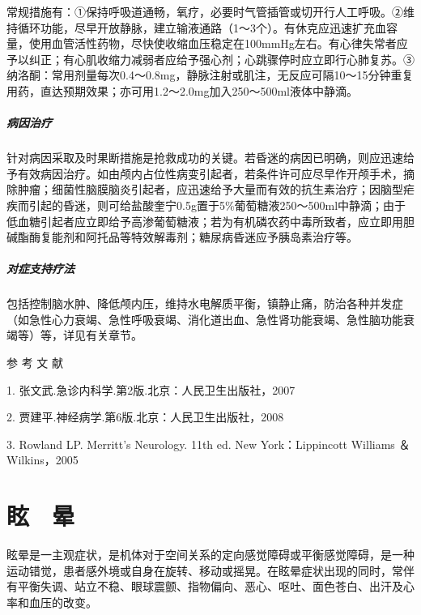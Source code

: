 常规措施有：①保持呼吸道通畅，氧疗，必要时气管插管或切开行人工呼吸。②维持循环功能，尽早开放静脉，建立输液通路（1～3个）。有休克应迅速扩充血容量，使用血管活性药物，尽快使收缩血压稳定在100mmHg左右。有心律失常者应予以纠正；有心肌收缩力减弱者应给予强心剂；心跳骤停时应立即行心肺复苏。③纳洛酮：常用剂量每次0.4～0.8mg，静脉注射或肌注，无反应可隔10～15分钟重复用药，直达预期效果；亦可用1.2～2.0mg加入250～500ml液体中静滴。

\paragraph{病因治疗}

针对病因采取及时果断措施是抢救成功的关键。若昏迷的病因已明确，则应迅速给予有效病因治疗。如由颅内占位性病变引起者，若条件许可应尽早作开颅手术，摘除肿瘤；细菌性脑膜脑炎引起者，应迅速给予大量而有效的抗生素治疗；因脑型疟疾而引起的昏迷，则可给盐酸奎宁0.5g置于5\%葡萄糖液250～500ml中静滴；由于低血糖引起者应立即给予高渗葡萄糖液；若为有机磷农药中毒所致者，应立即用胆碱酯酶复能剂和阿托品等特效解毒剂；糖尿病昏迷应予胰岛素治疗等。

\paragraph{对症支持疗法}

包括控制脑水肿、降低颅内压，维持水电解质平衡，镇静止痛，防治各种并发症（如急性心力衰竭、急性呼吸衰竭、消化道出血、急性肾功能衰竭、急性脑功能衰竭等）等，详见有关章节。

\protect\hypertarget{text00011.html}{}{}

\hypertarget{text00011.htmlux5cux23CHP1-2-4}{}
参 考 文 献

1. 张文武.急诊内科学.第2版.北京：人民卫生出版社，2007

2. 贾建平.神经病学.第6版.北京：人民卫生出版社，2008

3. Rowland LP. Merritt's Neurology. 11th ed. New York：Lippincott
Williams ＆ Wilkins，2005

\protect\hypertarget{text00012.html}{}{}

\chapter{眩　晕}

眩晕是一主观症状，是机体对于空间关系的定向感觉障碍或平衡感觉障碍，是一种运动错觉，患者感外境或自身在旋转、移动或摇晃。在眩晕症状出现的同时，常伴有平衡失调、站立不稳、眼球震颤、指物偏向、恶心、呕吐、面色苍白、出汗及心率和血压的改变。

